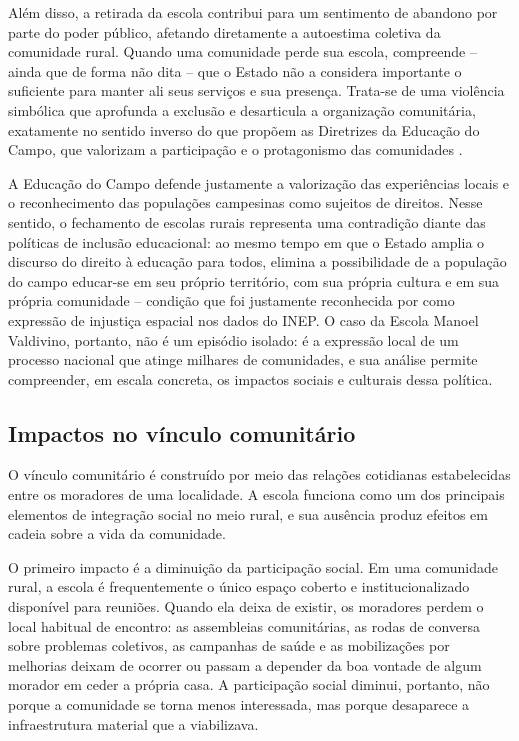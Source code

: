 \documentclass[
  12pt,
  openright,
  twoside,
  a4paper,
  english,
  brazilian,
  sumario=tradicional
]{abntex2}
\begin{document}
Além disso, a retirada da escola contribui para um sentimento de abandono por parte do poder público, afetando diretamente a autoestima coletiva da comunidade rural. Quando uma comunidade perde sua escola, compreende -- ainda que de forma não dita -- que o Estado não a considera importante o suficiente para manter ali seus serviços e sua presença. Trata-se de uma violência simbólica que aprofunda a exclusão e desarticula a organização comunitária, exatamente no sentido inverso do que propõem as Diretrizes da Educação do Campo, que valorizam a participação e o protagonismo das comunidades \cite{brasil2002}.

A Educação do Campo defende justamente a valorização das experiências locais e o reconhecimento das populações campesinas como sujeitos de direitos. Nesse sentido, o fechamento de escolas rurais representa uma contradição diante das políticas de inclusão educacional: ao mesmo tempo em que o Estado amplia o discurso do direito à educação para todos, elimina a possibilidade de a população do campo educar-se em seu próprio território, com sua própria cultura e em sua própria comunidade -- condição que foi justamente reconhecida por  como expressão de injustiça espacial nos dados do INEP. O caso da Escola Manoel Valdivino, portanto, não é um episódio isolado: é a expressão local de um processo nacional que atinge milhares de comunidades, e sua análise permite compreender, em escala concreta, os impactos sociais e culturais dessa política.

\subsection{Impactos no vínculo comunitário}
O vínculo comunitário é construído por meio das relações cotidianas estabelecidas entre os moradores de uma localidade. A escola funciona como um dos principais elementos de integração social no meio rural, e sua ausência produz efeitos em cadeia sobre a vida da comunidade.

O primeiro impacto é a diminuição da participação social. Em uma comunidade rural, a escola é frequentemente o único espaço coberto e institucionalizado disponível para reuniões. Quando ela deixa de existir, os moradores perdem o local habitual de encontro: as assembleias comunitárias, as rodas de conversa sobre problemas coletivos, as campanhas de saúde e as mobilizações por melhorias deixam de ocorrer ou passam a depender da boa vontade de algum morador em ceder a própria casa. A participação social diminui, portanto, não porque a comunidade se torna menos interessada, mas porque desaparece a infraestrutura material que a viabilizava.
\end{document}
